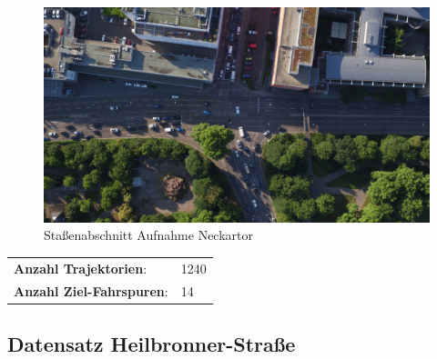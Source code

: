 \begin{minipage}{0.55\textwidth}
    \begin{figure}[H]
        \includegraphics[width=\linewidth]{resources/img/Anhang/Neckartor}
    \caption[]{Staßenabschnitt Aufnahme Neckartor}
    \label{fig:anhang_ds_neckartor}
    \end{figure}
\end{minipage} \hfill
\begin{minipage}{0.35\textwidth}
    \begin{tabular}{ll}
    \textbf{Anzahl Trajektorien}: & 1240 \\
    \textbf{Anzahl Ziel-Fahrspuren}: & 14 \\
    \end{tabular}
\end{minipage}

\subsection*{Datensatz Heilbronner-Straße}

